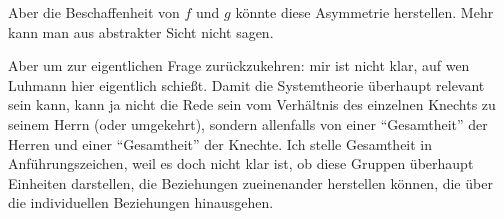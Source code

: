 \documentclass[a4paper, 10pt]{amsart}
\begin{document}
Aber die Beschaffenheit von $f$ und $g$ könnte diese Asymmetrie herstellen. Mehr kann man aus abstrakter Sicht nicht sagen.

Aber um zur eigentlichen Frage zurückzukehren: mir ist nicht klar, auf wen Luhmann hier eigentlich schießt. Damit die Systemtheorie überhaupt relevant sein kann, kann ja nicht die Rede sein vom Verhältnis des einzelnen Knechts zu seinem Herrn (oder umgekehrt), sondern allenfalls von einer ``Gesamtheit'' der Herren und einer ``Gesamtheit'' der Knechte. Ich stelle Gesamtheit in Anführungszeichen, weil es doch nicht klar ist, ob diese Gruppen überhaupt Einheiten darstellen, die Beziehungen zueinenander herstellen können, die über die individuellen Beziehungen hinausgehen.


\end{document}
